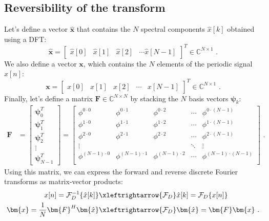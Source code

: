 \subsection{Reversibility of the transform}

Let's define a vector $\bm{\hat{x}}$ that contains the $N$ spectral
components $\hat{x}[k]$ obtained using a DFT:
\begin{equation}
\bm{\hat{x}}=\begin{bmatrix}
\hat{x}[0] & \hat{x}[1] & \hat{x}[2] & \cdots \hat{x}[N-1]
\end{bmatrix}^T \in \mathbb{C}^{N\times 1} \,\,.
\end{equation}
We also define a vector  $\bm{x}$, which contains the $N$ elements of the periodic signal $x[n]$:
\begin{equation}
\bm{x}=\begin{bmatrix}
x[0] & x[1] & x[2] & \cdots & x[N-1]
\end{bmatrix}^T \in \mathbb{C}^{N\times 1} \,\,.
\end{equation}
Finally, let's define a matrix $\bm{F}\in\mathbb{C}^{N\times N}$ by
stacking the $N$ basis vectors $\bm{\psi}_k$:
\begin{align*}
\bm{F} &= \begin{bmatrix}
\bm{\psi}_0^T \\
\bm{\psi}_1^T\\
\bm{\psi}_2^T\\
\vdots \\
\bm{\psi}_{N-1}^T
\end{bmatrix} = \begin{bmatrix}
\phi^{0\cdot0} & \phi^{0 \cdot 1} &  \phi^{0 \cdot 2} & \cdots & \phi^{0 \cdot (N-1)}\\
\phi^{1\cdot0} & \phi^{1 \cdot 1} &  \phi^{1 \cdot 2} & \cdots & \phi^{1 \cdot (N-1)}\\
\phi^{2\cdot0} & \phi^{2 \cdot 1} &  \phi^{2 \cdot 2} & \cdots & \phi^{2 \cdot (N-1)}\\
\vdots       &               &                 & \ddots & \vdots           \\
\phi^{(N-1)\cdot0} & \phi^{(N-1) \cdot 1} &  \phi^{(N-1) \cdot 2} & \cdots & \phi^{(N-1) \cdot (N-1)}\\
\end{bmatrix} \,\,.
\end{align*}
Using this matrix, we can express the forward and reverse discrete Fourier transforms as matrix-vector products:
\begin{align}
x[n] = \mathcal{F}_D^{-1}\{\hat{x}[k]\} &\xleftrightarrow{\mathcal{F}_D} \hat{x}[k] = \mathcal{F}_D\{x[n]\}\\
\bm{x}=\frac{1}{N}\bm{F}^H\bm{\hat{x}} &\xleftrightarrow{\mathcal{F}_D} \bm{\hat{x}}=\bm{F} \bm{x} \,\,.
\end{align}
